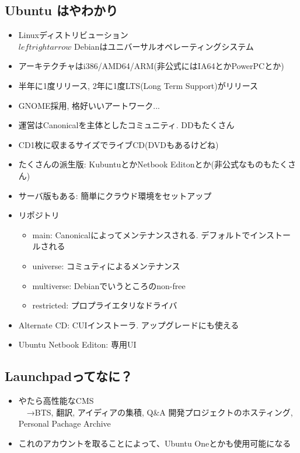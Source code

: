 \documentclass[mingoth,a4paper]{jsarticle}
\begin{document}
\subsection{Ubuntu はやわかり}
\begin{itemize}
      \item Linuxディストリビューション\\
    $leftrightarrow$ Debianはユニバーサルオペレーティングシステム
      \item アーキテクチャはi386/AMD64/ARM(非公式にはIA64とかPowerPCとか)
      \item 半年に1度リリース, 2年に1度LTS(Long Term Support)がリリース
      \item GNOME採用, 格好いいアートワーク...
      \item 運営はCanonicalを主体としたコミュニティ. DDもたくさん
      \item CD1枚に収まるサイズでライブCD(DVDもあるけどね)
      \item たくさんの派生版: KubuntuとかNetbook Editonとか(非公式なものもたくさん)
      \item サーバ版もある: 簡単にクラウド環境をセットアップ
      \item リポジトリ
    \begin{itemize}
          \item main: Canonicalによってメンテナンスされる. デフォルトでインストールされる
          \item universe: コミュティによるメンテナンス
          \item multiverse: Debianでいうところのnon-free
          \item restricted: プロプライエタリなドライバ
    \end{itemize}
      \item Alternate CD: CUIインストーラ. アップグレードにも使える
      \item Ubuntu Netbook Editon: 専用UI
\end{itemize}

\subsection{Launchpadってなに？}
\begin{itemize}
      \item やたら高性能なCMS\\
    　→BTS, 翻訳, アイディアの集積, Q\&A
    開発プロジェクトのホスティング, Personal Pachage Archive
      \item これのアカウントを取ることによって、Ubuntu Oneとかも使用可能になる
\end{itemize}
\end{document}
